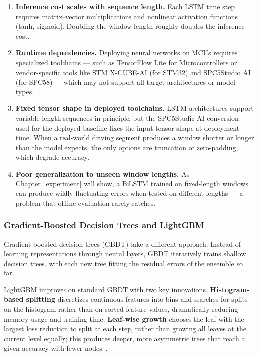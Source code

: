 \begin{enumerate}
    \item \textbf{Inference cost scales with sequence length.} Each LSTM time step requires matrix--vector multiplications and nonlinear activation functions (tanh, sigmoid). Doubling the window length roughly doubles the inference cost.
    \item \textbf{Runtime dependencies.} Deploying neural networks on MCUs requires specialized toolchains --- such as TensorFlow Lite for Microcontrollers or vendor-specific tools like STM X-CUBE-AI (for STM32) and SPC5Studio AI (for SPC58) --- which may not support all target architectures or model types.
    \item \textbf{Fixed tensor shape in deployed toolchains.} LSTM architectures support variable-length sequences in principle, but the SPC5Studio AI conversion used for the deployed baseline fixes the input tensor shape at deployment time. When a real-world driving segment produces a window shorter or longer than the model expects, the only options are truncation or zero-padding, which degrade accuracy.
    \item \textbf{Poor generalization to unseen window lengths.} As Chapter~\ref{experiment} will show, a BiLSTM trained on fixed-length windows can produce wildly fluctuating errors when tested on different lengths --- a problem that offline evaluation rarely catches.
\end{enumerate}

\subsubsection*{Gradient-Boosted Decision Trees and LightGBM}

Gradient-boosted decision trees (GBDT) take a different approach. Instead of learning representations through neural layers, GBDT iteratively trains shallow decision trees, with each new tree fitting the residual errors of the ensemble so far.

LightGBM improves on standard GBDT with two key innovations. \textbf{Histogram-based splitting} discretizes continuous features into bins and searches for splits on the histogram rather than on sorted feature values, dramatically reducing memory usage and training time. \textbf{Leaf-wise growth} chooses the leaf with the largest loss reduction to split at each step, rather than growing all leaves at the current level equally; this produces deeper, more asymmetric trees that reach a given accuracy with fewer nodes~\autocite{ke2017}.


